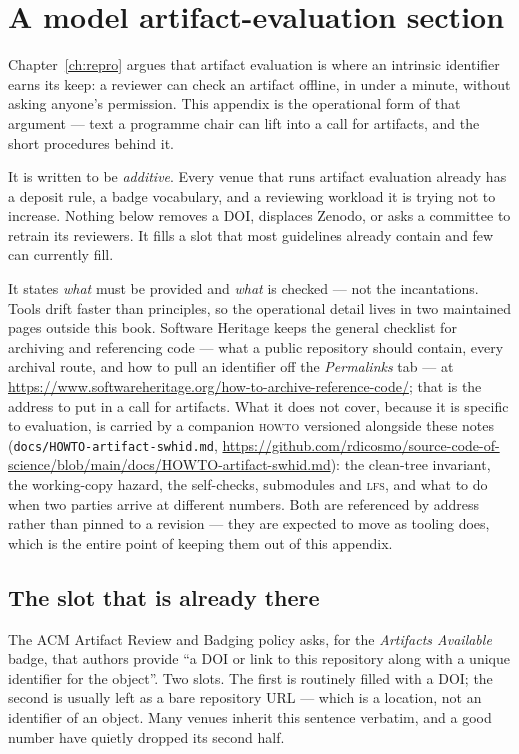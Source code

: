 \chapter{A model artifact-evaluation section}
\label{app:aec-model}

Chapter~\ref{ch:repro} argues that artifact evaluation is where an intrinsic identifier earns
its keep: a reviewer can check an artifact offline, in under a minute, without asking anyone's
permission. This appendix is the operational form of that argument --- text a programme chair
can lift into a call for artifacts, and the short procedures behind it.

It is written to be \emph{additive}. Every venue that runs artifact evaluation already has a
deposit rule, a badge vocabulary, and a reviewing workload it is trying not to increase. Nothing
below removes a DOI, displaces Zenodo, or asks a committee to retrain its reviewers. It fills a
slot that most guidelines already contain and few can currently fill.

It states \emph{what} must be provided and \emph{what} is checked --- not the incantations. Tools
drift faster than principles, so the operational detail lives in two maintained pages outside this
book. Software Heritage keeps the general checklist for archiving and referencing code --- what a
public repository should contain, every archival route, and how to pull an identifier off the
\emph{Permalinks} tab --- at
\url{https://www.softwareheritage.org/how-to-archive-reference-code/}; that is the address to put
in a call for artifacts. What it does not cover, because it is specific to evaluation, is carried
by a companion \textsc{howto} versioned alongside these notes
(\texttt{docs/HOWTO-artifact-swhid.md},
\url{https://github.com/rdicosmo/source-code-of-science/blob/main/docs/HOWTO-artifact-swhid.md}):
the clean-tree invariant, the working-copy hazard, the self-checks, submodules and \textsc{lfs},
and what to do when two parties arrive at different numbers. Both are referenced by address rather
than pinned to a revision --- they are expected to move as tooling does, which is the entire point
of keeping them out of this appendix.

\section{The slot that is already there}

The ACM Artifact Review and Badging policy asks, for the \emph{Artifacts Available} badge, that
authors provide \enquote{a DOI or link to this repository along with a unique identifier for the
object}. Two slots. The first is routinely filled with a DOI; the second is usually left as a bare
repository URL --- which is a location, not an identifier of an object. Many venues inherit this
sentence verbatim, and a good number have quietly dropped its second half.

